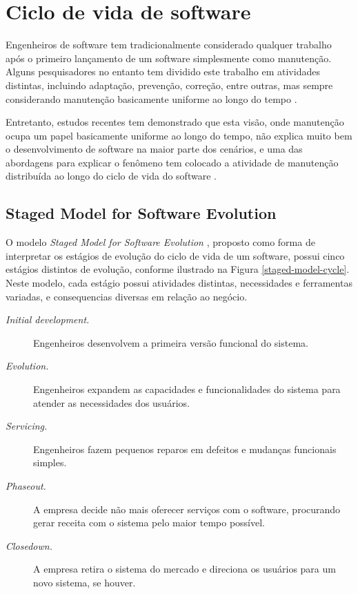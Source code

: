 \section{Ciclo de vida de software}

Engenheiros de software tem tradicionalmente considerado qualquer trabalho após
o primeiro lançamento de um software simplesmente como manutenção. Alguns
pesquisadores no entanto tem dividido este trabalho em atividades distintas, incluindo
adaptação, prevenção, correção, entre outras, mas sempre considerando manutenção
basicamente uniforme ao longo do tempo \cite{rajlich2000staged}.

Entretanto, estudos recentes tem demonstrado que esta visão, onde manutenção
ocupa um papel basicamente uniforme ao longo do tempo, não explica muito bem o
desenvolvimento de software na maior parte dos cenários, e uma das abordagens
para explicar o fenômeno tem colocado a atividade de manutenção distribuída ao
longo do ciclo de vida do software \cite{rajlich2000staged}.

\subsection{Staged Model for Software Evolution}

O modelo {\it Staged Model for Software Evolution} \cite{rajlich2000staged},
proposto como forma de interpretar os estágios de evolução do ciclo de vida de um software,
possui cinco estágios distintos de evolução,
conforme ilustrado na Figura \ref{staged-model-cycle}. Neste modelo, cada
estágio possui atividades distintas, necessidades e
ferramentas variadas, e consequencias diversas em relação ao negócio.

\begin{description}
  \item [{\it Initial development.}]
    Engenheiros desenvolvem a primeira versão funcional do sistema.
  \item [{\it Evolution.}]
    Engenheiros expandem as capacidades e funcionalidades do sistema para
    atender as necessidades dos usuários.
  \item [{\it Servicing.}]
    Engenheiros fazem pequenos reparos em defeitos e mudanças funcionais
    simples.
  \item [{\it Phaseout.}]
    A empresa decide não mais oferecer serviços com o software, procurando
    gerar receita com o sistema pelo maior tempo possível.
  \item [{\it Closedown.}]
    A empresa retira o sistema do mercado e direciona os usuários para um novo
    sistema, se houver.
\end{description}

